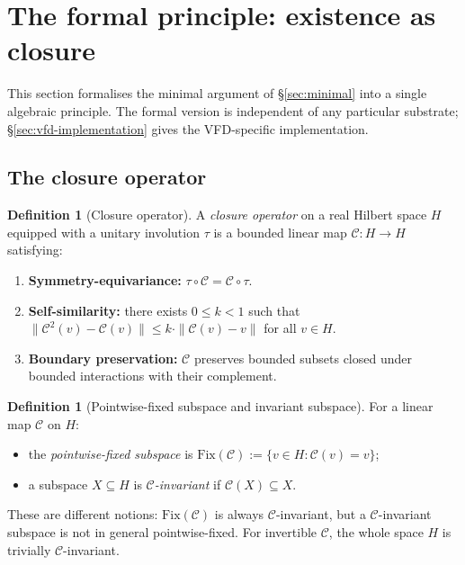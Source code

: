\documentclass[11pt]{article}
\theoremstyle{plain}
\theoremstyle{definition}
\newtheorem{definition}[theorem]{Definition}
\theoremstyle{remark}
\newcommand{\Ccal}{\mathcal{C}}
\newcommand{\Fix}{\mathrm{Fix}}
\begin{document}
\section{The formal principle: existence as closure}\label{sec:formal}

This section formalises the minimal argument of \S\ref{sec:minimal} into a single algebraic principle. The formal version is independent of any particular substrate; \S\ref{sec:vfd-implementation} gives the VFD-specific implementation.

\subsection{The closure operator}

\begin{definition}[Closure operator]\label{def:closure}
A \emph{closure operator} on a real Hilbert space $H$ equipped with a unitary involution $\tau$ is a bounded linear map $\Ccal: H \to H$ satisfying:
\begin{enumerate}[leftmargin=2em]
\item \textbf{Symmetry-equivariance:} $\tau \circ \Ccal = \Ccal \circ \tau$.
\item \textbf{Self-similarity:} there exists $0 \leq k < 1$ such that $\|\Ccal^2(v) - \Ccal(v)\| \leq k \cdot \|\Ccal(v) - v\|$ for all $v \in H$.
\item \textbf{Boundary preservation:} $\Ccal$ preserves bounded subsets closed under bounded interactions with their complement.
\end{enumerate}
\end{definition}

\begin{definition}[Pointwise-fixed subspace and invariant subspace]\label{def:fixed-vs-invariant}
For a linear map $\Ccal$ on $H$:
\begin{itemize}[leftmargin=2em]
\item the \emph{pointwise-fixed subspace} is $\Fix(\Ccal) := \{ v \in H : \Ccal(v) = v \}$;
\item a subspace $X \subseteq H$ is \emph{$\Ccal$-invariant} if $\Ccal(X) \subseteq X$.
\end{itemize}
These are different notions: $\Fix(\Ccal)$ is always $\Ccal$-invariant, but a $\Ccal$-invariant subspace is not in general pointwise-fixed. For invertible $\Ccal$, the whole space $H$ is trivially $\Ccal$-invariant.
\end{definition}
\end{document}
